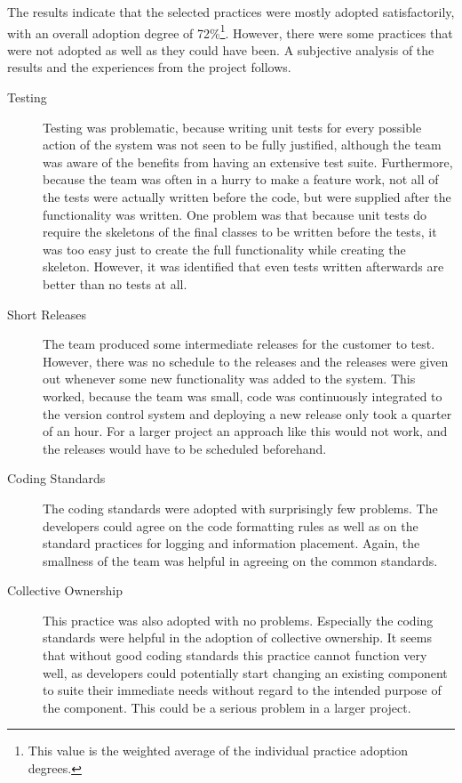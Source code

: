 The results indicate that the selected  practices were 
mostly adopted satisfactorily, with an overall adoption degree of 
72\%\footnote{This value is the weighted average of the individual 
practice adoption degrees.}. However, there were some practices that 
were not adopted as well as they could have been. A subjective 
analysis of the results and the experiences from the project follows.

\begin{description}

\item[Testing] Testing was problematic, because writing unit tests for 
every possible action of the system was not seen to be fully 
justified, although the team was aware of the benefits from having an 
extensive test suite. Furthermore, because the team was often in a 
hurry to make a feature work, not all of the tests were actually 
written before the code, but were supplied after the functionality was 
written. One problem was that because unit tests do require the 
skeletons of the final classes to be written before the tests, it was 
too easy just to create the full functionality while creating the 
skeleton. However, it was identified that even tests written 
afterwards are better than no tests at all.

\item[Short Releases] The team produced some intermediate releases for 
the customer to test. However, there was no schedule to the releases 
and the releases were given out whenever some new functionality was 
added to the system. This worked, because the team was small, code was 
continuously integrated to the version control system and deploying a 
new release only took a quarter of an hour. For a larger project an 
approach like this would not work, and the releases would have to be 
scheduled beforehand.

\item[Coding Standards] The coding standards were adopted with 
surprisingly few problems. The developers could agree on the code 
formatting rules as well as on the standard practices for logging and 
information placement. Again, the smallness of the team was helpful in 
agreeing on the common standards.

\item[Collective Ownership] This practice was also adopted with no 
problems. Especially the coding standards were helpful in the adoption 
of collective ownership. It seems that without good coding standards 
this practice cannot function very well, as developers could 
potentially start changing an existing component to suite their 
immediate needs without regard to the intended purpose of the 
component. This could be a serious problem in a larger project.


\end{description}
